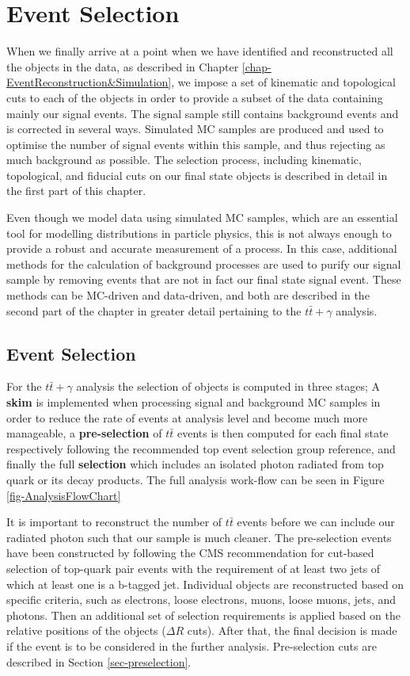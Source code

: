 \chapter{Event Selection} \label{chap-EventSelection}

When we finally arrive at a point when we have identified and reconstructed all the objects in the data, as described in Chapter \ref{chap-EventReconstruction&Simulation}, we impose a set of kinematic and topological cuts to each of the objects in order to provide a subset of the data containing mainly our signal events. The signal sample still contains background events and is corrected in several ways. Simulated MC samples are produced and used to optimise the number of signal events within this sample, and thus rejecting as much background as possible. The selection process, including kinematic, topological, and fiducial cuts on our final state objects is described in detail in the first part of this chapter.

Even though we model data using simulated MC samples, which are an essential tool for modelling distributions in particle physics, this is not always enough to provide a robust and accurate measurement of a process. In this case, additional methods for the calculation of background processes are used to purify our signal sample by removing events that are not in fact our final state signal event. These methods can be MC-driven and data-driven, and both are described in the second part of the chapter in greater detail pertaining to the $t\bar{t}+\gamma$ analysis.  

\section{Event Selection} \label{sec-EventSelection}

For the $t\bar{t}+\gamma$ analysis the selection of objects is computed in three stages; A \textbf{skim} is implemented when processing signal and background MC samples in order to reduce the rate of events at analysis level and become much more manageable, a \textbf{pre-selection} of $t\bar{t}$ events is then computed for each final state respectively following the recommended top event selection group reference, and finally the full \textbf{selection} which includes an isolated photon radiated from top quark or its decay products. The full analysis work-flow can be seen in Figure \ref{fig-AnalysisFlowChart}   

It is important to reconstruct the number of $t\bar{t}$ events before we can include our radiated photon such that our sample is much cleaner. 
The pre-selection events have been constructed by following the CMS recommendation for cut-based selection of top-quark pair events with the requirement of at least two jets of which at least one is a b-tagged jet. Individual objects are reconstructed based on specific criteria, such as electrons, loose electrons, muons, loose muons, jets, and photons. Then an additional set of selection requirements is applied based on the relative positions of the objects ($\Delta R$ cuts). After that, the final decision is made if the event is to be considered in the further analysis. Pre-selection cuts are described in Section \ref{sec-preselection}.

